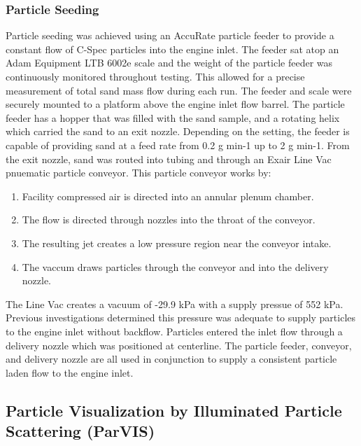 \documentclass[12pt]{iopart}
\begin{document}
\subsubsection{Particle Seeding}
Particle seeding was achieved using an AccuRate particle feeder to provide a constant flow of C-Spec particles into the engine inlet. The feeder sat atop an Adam Equipment LTB 6002e scale and the weight of the particle feeder was continuously monitored throughout testing. This allowed for a precise measurement of total sand mass flow during each run. The feeder and scale were securely mounted to a platform above the engine inlet flow barrel. The particle feeder has a hopper that was filled with the sand sample, and a rotating helix which carried the sand to an exit nozzle. Depending on the setting, the feeder is capable of providing sand at a feed rate from 0.2 g min-1 up to 2 g min-1. From the exit nozzle, sand was routed into tubing and through an Exair Line Vac pnuematic particle conveyor. This particle conveyor works by:
\begin{enumerate}
    \item Facility compressed air is directed into an annular plenum chamber.
    \item The flow is directed through nozzles into the throat of the conveyor. 
    \item The resulting jet creates a low pressure region near the conveyor intake.
    \item The vaccum draws particles through the conveyor and into the delivery nozzle. 
\end{enumerate}
The Line Vac creates a vacuum of -29.9 kPa with a supply pressue of 552 kPa. Previous investigations determined this pressure was adequate to supply particles to the engine inlet without backflow. Particles entered the inlet flow through a delivery nozzle which was positioned at centerline. The particle feeder, conveyor, and delivery nozzle are all used in conjunction to supply a consistent particle laden flow to the engine inlet. 
\subsection{Particle Visualization by Illuminated Particle Scattering (ParVIS)}
\end{document}
